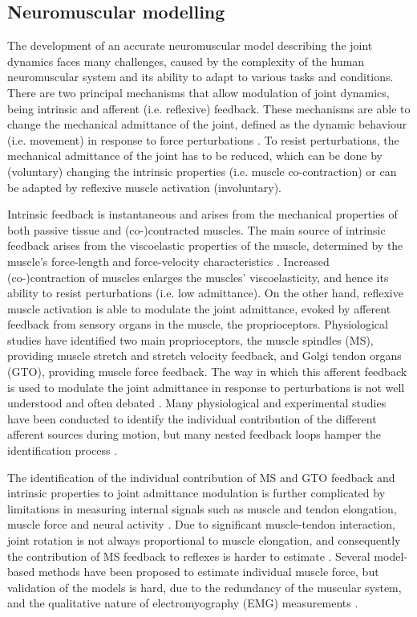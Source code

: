 \subsection*{Neuromuscular modelling}
The development of an accurate neuromuscular model describing the joint dynamics faces many challenges, caused by the complexity of the human neuromuscular system and its ability to adapt to various tasks and conditions. There are two principal mechanisms that allow modulation of joint dynamics, being intrinsic and afferent (i.e. reflexive) feedback. These mechanisms are able to change the mechanical admittance of the joint, defined as the dynamic behaviour (i.e. movement) in response to force perturbations \cite{schouten_nmclab_2008}. To resist perturbations, the mechanical admittance of the joint has to be reduced, which can be done by (voluntary) changing the intrinsic properties (i.e. muscle co-contraction) or can be adapted by reflexive muscle activation (involuntary). 

Intrinsic feedback is instantaneous and arises from the mechanical properties of both passive tissue and (co-)contracted muscles. The main source of intrinsic feedback arises from the viscoelastic properties of the muscle, determined by the muscle’s force-length and force-velocity characteristics \cite{winter_biomechanics_1988}. Increased \mbox{(co-)contraction} of muscles enlarges the muscles' viscoelasticity, and hence its ability to resist perturbations (i.e. low admittance). On the other hand, reflexive muscle activation is able to modulate the joint admittance, evoked by afferent feedback from sensory organs in the muscle, the proprioceptors. Physiological studies have identified two main proprioceptors, the muscle spindles (MS), providing muscle stretch and stretch velocity feedback, and Golgi tendon organs (GTO), providing muscle force feedback. The way in which this afferent feedback is used to modulate the joint admittance in response to perturbations is not well understood and often debated \cite{loeb_hard_1987}. Many physiological and experimental studies have been conducted to identify the individual contribution of the different afferent sources during motion, but many nested feedback loops hamper the identification process \cite{schouten_nmclab_2008}. 

The identification of the individual contribution of MS and GTO feedback and intrinsic properties to joint admittance modulation is further complicated by limitations in measuring internal signals such as muscle and tendon elongation, muscle force and neural activity \cite{allen_why_2016}. Due to significant muscle-tendon interaction, joint rotation is not always proportional to muscle elongation, and consequently the contribution of MS feedback to reflexes is harder to estimate \cite{zajac_muscle_1989}. Several model-based methods have been proposed to estimate individual muscle force, but validation of the models is hard, due to the redundancy of the muscular system, and the qualitative nature of electromyography (EMG) measurements \cite{erdemir_model-based_2007}. 

